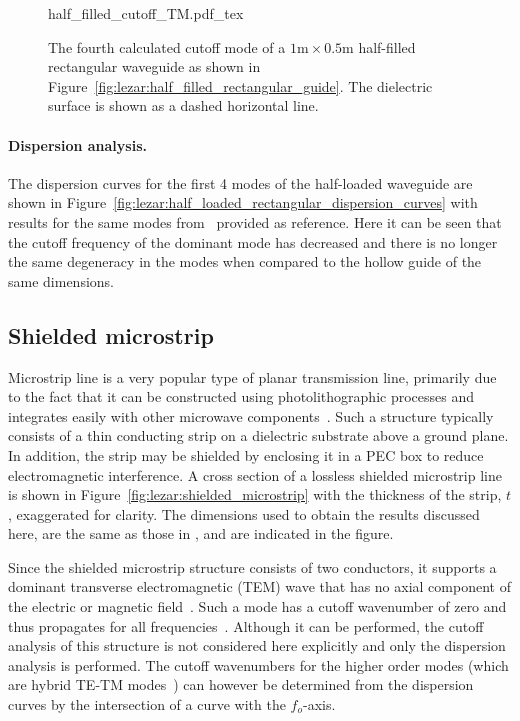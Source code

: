 \begin{figure}
\bwfig
\centering
  \def\svgwidth{\smallfig}
    {half_filled_cutoff_TM.pdf_tex}
\caption{The fourth calculated cutoff mode of a
$1\text{m}\times0.5\text{m}$ half-filled rectangular waveguide as shown
in Figure~\ref{fig:lezar:half_filled_rectangular_guide}. The dielectric
surface is shown as a dashed horizontal line.}
\label{fig:lezar:half_filled_rectangular_cutoff_TM}
\end{figure}

\paragraph{Dispersion analysis.}

The dispersion curves for the first 4
modes of the half-loaded waveguide are shown in
Figure~\ref{fig:lezar:half_loaded_rectangular_dispersion_curves}
with results for the same modes from~\citet{Jin2002} provided as
reference. Here it can be seen that the cutoff frequency of the dominant
mode has decreased and there is no longer the same degeneracy in the
modes when compared to the hollow guide of the same dimensions.

\enlargethispage{12pt}

\subsection{Shielded microstrip}
\label{lezar:sec:shielded_microstrip}

Microstrip line is a very popular type of planar transmission
line, primarily due to the fact that it can be constructed using
photolithographic processes and integrates easily with other microwave
components~\citep{Pozar2005}. Such a structure typically consists of a
thin conducting strip on a dielectric substrate above a ground plane. In
addition, the strip may be shielded by enclosing it in a PEC box to reduce
electromagnetic interference. A cross section of a lossless shielded
microstrip line is shown in Figure~\ref{fig:lezar:shielded_microstrip}
with the thickness of the strip, $t$, exaggerated for clarity. The
dimensions used to obtain the results discussed here, are the same as
those in \citet{PelosiCoccioliSelleri1998}, and are indicated in the figure.

Since the shielded microstrip structure consists of two
conductors, it supports a dominant transverse electromagnetic
(TEM) wave that has no axial component of the electric or
magnetic field~\citep{Pozar2005}. Such a mode has a cutoff
wavenumber of zero and thus propagates for all
frequencies~\citep{Jin2002,PelosiCoccioliSelleri1998}. Although it can
be performed, the cutoff analysis of this structure is not considered
here explicitly and only the dispersion analysis is performed. The
cutoff wavenumbers for the higher order modes (which are hybrid TE-TM
modes~\citep{Pozar2005}) can however be determined from the dispersion
curves by the intersection of a curve with the $f_o$-axis.\pagebreak

